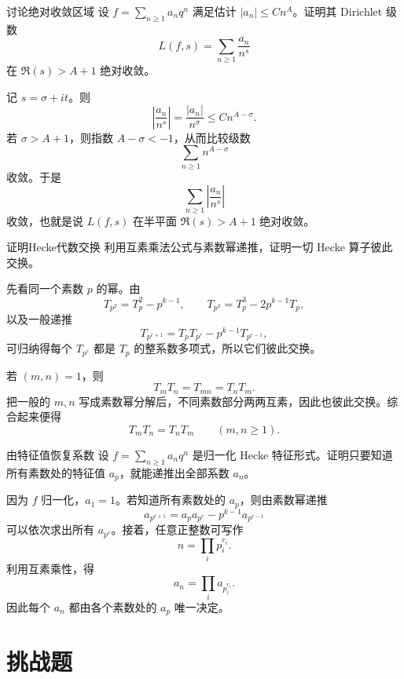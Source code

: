 \begin{problem}{讨论绝对收敛区域}
\medium
设 $f=\sum_{n\ge1}a_nq^n$ 满足估计 $|a_n|\le Cn^A$。证明其 Dirichlet 级数
\[
L(f,s)=\sum_{n\ge1}\frac{a_n}{n^s}
\]
在 $\Re(s)>A+1$ 绝对收敛。
\end{problem}
\begin{solution}
记 $s=\sigma+it$。则
\[
\left|\frac{a_n}{n^s}\right|=\frac{|a_n|}{n^\sigma}\le Cn^{A-\sigma}.
\]
若 $\sigma>A+1$，则指数 $A-\sigma<-1$，从而比较级数
\[
\sum_{n\ge1}n^{A-\sigma}
\]
收敛。于是
\[
\sum_{n\ge1}\left|\frac{a_n}{n^s}\right|
\]
收敛，也就是说 $L(f,s)$ 在半平面 $\Re(s)>A+1$ 绝对收敛。
\end{solution}

\begin{problem}{证明Hecke代数交换}
\medium
利用互素乘法公式与素数幂递推，证明一切 Hecke 算子彼此交换。
\end{problem}
\begin{solution}
先看同一个素数 $p$ 的幂。由
\[
T_{p^2}=T_p^2-p^{k-1},
\qquad
T_{p^3}=T_p^3-2p^{k-1}T_p,
\]
以及一般递推
\[
T_{p^{r+1}}=T_pT_{p^r}-p^{k-1}T_{p^{r-1}},
\]
可归纳得每个 $T_{p^r}$ 都是 $T_p$ 的整系数多项式，所以它们彼此交换。

若 $(m,n)=1$，则
\[
T_mT_n=T_{mn}=T_nT_m.
\]
把一般的 $m,n$ 写成素数幂分解后，不同素数部分两两互素，因此也彼此交换。综合起来便得
\[
T_mT_n=T_nT_m
\qquad (m,n\ge1).
\]
\end{solution}

\begin{problem}{由特征值恢复系数}
\medium
设 $f=\sum_{n\ge1}a_nq^n$ 是归一化 Hecke 特征形式。证明只要知道所有素数处的特征值 $a_p$，就能递推出全部系数 $a_n$。
\end{problem}
\begin{solution}
因为 $f$ 归一化，$a_1=1$。若知道所有素数处的 $a_p$，则由素数幂递推
\[
a_{p^{r+1}}=a_pa_{p^r}-p^{k-1}a_{p^{r-1}}
\]
可以依次求出所有 $a_{p^r}$。接着，任意正整数可写作
\[
n=\prod_i p_i^{r_i}.
\]
利用互素乘性，得
\[
a_n=\prod_i a_{p_i^{r_i}}.
\]
因此每个 $a_n$ 都由各个素数处的 $a_p$ 唯一决定。
\end{solution}

\section{挑战题 \hard}

